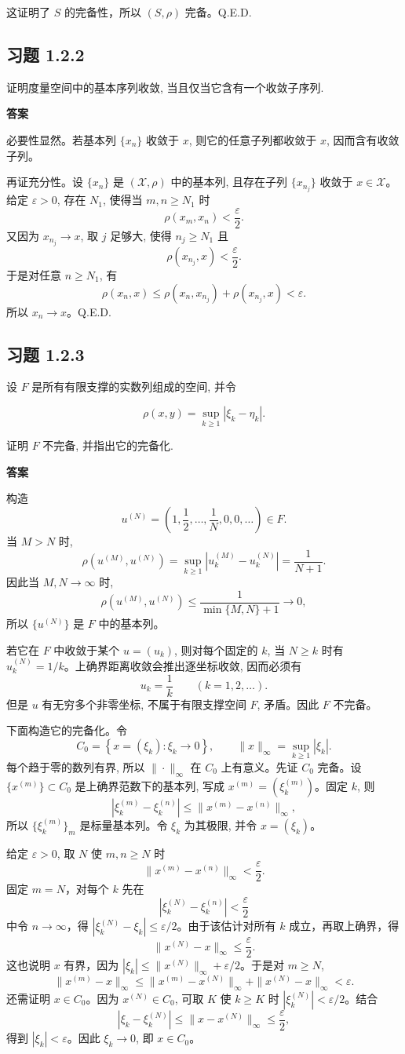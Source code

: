 \documentclass[UTF8,a4paper,11pt,fontset=fandol]{ctexart}
\newcommand{\exercise}[1]{\par\ifdim\dimexpr\pagegoal-\pagetotal\relax<7\baselineskip\newpage\fi\subsection*{习题 #1}}
\newcommand{\answer}{\par\smallskip\noindent\textbf{答案}\quad}
\newcommand{\qedherecustom}{\unskip\hfill\mbox{\normalfont Q.E.D.}\par}
\begin{document}
这证明了 $S$ 的完备性，所以 $(S,\rho)$ 完备。\qedherecustom

\exercise{1.2.2}

证明度量空间中的基本序列收敛, 当且仅当它含有一个收敛子序列.

\answer

必要性显然。若基本列 $\{x_n\}$ 收敛于 $x$, 则它的任意子列都收敛于 $x$, 因而含有收敛子列。

再证充分性。设 $\{x_n\}$ 是 $(\mathcal X,\rho)$ 中的基本列, 且存在子列 $\{x_{n_j}\}$ 收敛于 $x\in\mathcal X$。给定 $\varepsilon>0$, 存在 $N_1$, 使得当 $m,n\geq N_1$ 时
\[
\rho(x_m,x_n)<\frac\varepsilon2.
\]
又因为 $x_{n_j}\to x$, 取 $j$ 足够大, 使得 $n_j\geq N_1$ 且
\[
\rho(x_{n_j},x)<\frac\varepsilon2.
\]
于是对任意 $n\geq N_1$, 有
\[
\rho(x_n,x)
\leq\rho(x_n,x_{n_j})+\rho(x_{n_j},x)
<\varepsilon.
\]
所以 $x_n\to x$。\qedherecustom

\exercise{1.2.3}

设 $F$ 是所有有限支撑的实数列组成的空间, 并令

\[
\rho(x,y)=\sup_{k\ge1}|\xi_k-\eta_k|.
\]

证明 $F$ 不完备, 并指出它的完备化.

\answer

构造
\[
u^{(N)}=\left(1,\frac12,\ldots,\frac1N,0,0,\ldots\right)\in F.
\]
当 $M>N$ 时,
\[
\rho\left(u^{(M)},u^{(N)}\right)
=\sup_{k\geq1}\left|u^{(M)}_k-u^{(N)}_k\right|
=\frac1{N+1}.
\]
因此当 $M,N\to\infty$ 时,
\[
\rho\left(u^{(M)},u^{(N)}\right)
\leq\frac1{\min\{M,N\}+1}\longrightarrow0,
\]
所以 $\{u^{(N)}\}$ 是 $F$ 中的基本列。

若它在 $F$ 中收敛于某个 $u=(u_k)$, 则对每个固定的 $k$, 当 $N\geq k$ 时有 $u^{(N)}_k=1/k$。上确界距离收敛会推出逐坐标收敛, 因而必须有
\[
u_k=\frac1k\qquad(k=1,2,\ldots).
\]
但是 $u$ 有无穷多个非零坐标, 不属于有限支撑空间 $F$, 矛盾。因此 $F$ 不完备。

下面构造它的完备化。令
\[
C_0=\left\{x=(\xi_k):\xi_k\longrightarrow0\right\},
\qquad
\|x\|_\infty=\sup_{k\geq1}|\xi_k|.
\]
每个趋于零的数列有界, 所以 $\|\cdot\|_\infty$ 在 $C_0$ 上有意义。先证 $C_0$ 完备。设 $\{x^{(m)}\}\subset C_0$ 是上确界范数下的基本列, 写成 $x^{(m)}=(\xi^{(m)}_k)$。固定 $k$, 则
\[
|\xi^{(m)}_k-\xi^{(n)}_k|
\leq\|x^{(m)}-x^{(n)}\|_\infty,
\]
所以 $\{\xi^{(m)}_k\}_m$ 是标量基本列。令 $\xi_k$ 为其极限, 并令 $x=(\xi_k)$。

给定 $\varepsilon>0$, 取 $N$ 使 $m,n\geq N$ 时
\[
\|x^{(m)}-x^{(n)}\|_\infty<\frac\varepsilon2.
\]
固定 $m=N$，对每个 $k$ 先在
\[
|\xi^{(N)}_k-\xi^{(n)}_k|<\frac\varepsilon2
\]
中令 $n\to\infty$，得 $|\xi^{(N)}_k-\xi_k|\leq\varepsilon/2$。由于该估计对所有 $k$ 成立，再取上确界，得
\[
\|x^{(N)}-x\|_\infty\leq\frac\varepsilon2.
\]
这也说明 $x$ 有界，因为 $|\xi_k|\leq\|x^{(N)}\|_\infty+\varepsilon/2$。于是对 $m\geq N$,
\[
\|x^{(m)}-x\|_\infty
\leq\|x^{(m)}-x^{(N)}\|_\infty+\|x^{(N)}-x\|_\infty
<\varepsilon.
\]
还需证明 $x\in C_0$。因为 $x^{(N)}\in C_0$, 可取 $K$ 使 $k\geq K$ 时 $|\xi^{(N)}_k|<\varepsilon/2$。结合
\[
|\xi_k-\xi^{(N)}_k|\leq\|x-x^{(N)}\|_\infty\leq\frac\varepsilon2,
\]
得到 $|\xi_k|<\varepsilon$。因此 $\xi_k\to0$, 即 $x\in C_0$。
\end{document}
